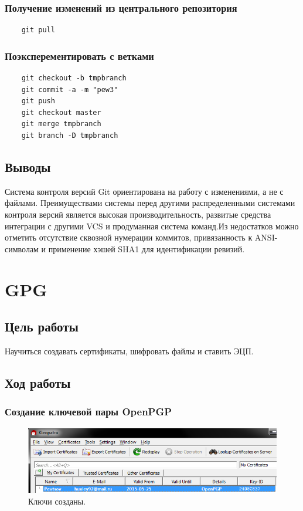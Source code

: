 \documentclass[a4paper, 14pt]{article}				%
\begin{document}
\subsubsection{Получение изменений из центрального репозитория}
\begin{verbatim}
	git pull
\end{verbatim}

\subsubsection{Поэксперементировать с ветками}
\begin{verbatim}
	git checkout -b tmpbranch
	git commit -a -m "pew3"
	git push
	git checkout master
	git merge tmpbranch
	git branch -D tmpbranch
\end{verbatim}

\subsection{Выводы}
Система контроля версий Git ориентирована на работу с изменениями, а не с файлами. Преимуществами системы перед другими распределенными системами контроля версий является высокая производительность, развитые средства интеграции с другими VCS и продуманная система команд.Из недостатков можно отметить отсутствие сквозной нумерации коммитов, привязанность к ANSI-символам и применение хэшей SHA1 для идентификации ревизий.

\newpage
\section{GPG}
\subsection{Цель работы}
Научиться создавать сертификаты, шифровать файлы и ставить ЭЦП.
\subsection{Ход работы}
\subsubsection{Создание ключевой пары OpenPGP}
\begin{figure}[h!]
\centering
\includegraphics[width=\textwidth]{fig8}
\caption{Ключи созданы.}
\end{figure}
\end{document}
